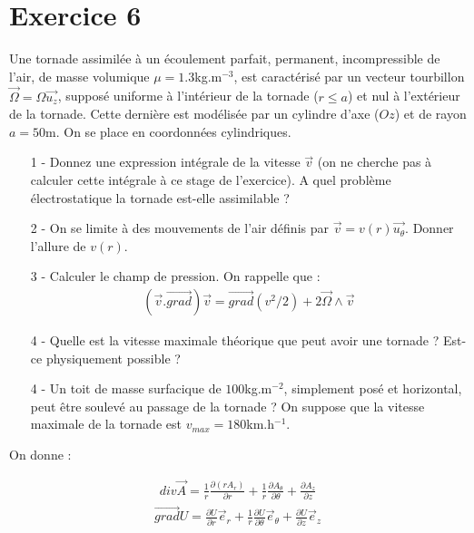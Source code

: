 \documentclass{report}
\begin{document}
\section*{Exercice 6}

Une tornade assimilée à un écoulement parfait, permanent, incompressible de l'air, de masse volumique $\mu = 1.3$kg.m$^{-3}$, est caractérisé par un vecteur tourbillon $\vec{\Omega} = \Omega \vec{u_{z}}$, supposé uniforme à l'intérieur de la tornade ($r\leq a$) et nul à l'extérieur de la tornade. Cette dernière est modélisée par un cylindre d'axe ($Oz$) et de rayon $a=50$m. On se place en coordonnées cylindriques.

\begin{itemize}

	\item[1 - ] Donnez une expression intégrale de la vitesse $\vec{v}$ (on ne cherche pas à calculer cette intégrale à ce stage de l'exercice). A quel problème électrostatique la tornade est-elle assimilable ?
	\item[2 - ] On se limite à des mouvements de l'air définis par $\vec{v} = v(r)\vec{u_{\theta}}$. Donner l'allure de $v(r)$.
	\item[3 - ] Calculer le champ de pression. On rappelle que : 
	\begin{align*}
		(\vec{v}.\vec{grad})\vec{v} =\vec{grad}(v^{2}/2) + 2\vec{\Omega}\wedge \vec{v}
	\end{align*}
	\item[4 - ] Quelle est la vitesse maximale théorique que peut avoir une tornade ? Est-ce physiquement possible ?
	\item[4 - ] Un toit de masse surfacique de $100$kg.m$^{-2}$, simplement posé et horizontal, peut être soulevé au passage de la tornade ? On suppose que la vitesse maximale de la tornade est $v_{max} = 180$km.h$^{-1}$.
\end{itemize}

On donne :

\begin{align*}
	div\vec{A} = \frac{1}{r}\frac{\partial(rA_{r})}{\partial r} +\frac{1}{r}\frac{\partial A_{\theta}}{\partial\theta} + \frac{\partial A_{z}}{\partial z}
\end{align*}
\begin{align*}
	\vec{grad}U = \frac{\partial U}{\partial r}\vec{e}_{r} +\frac{1}{r}\frac{\partial U}{\partial\theta}\vec{e}_{\theta} + \frac{\partial U}{\partial z}\vec{e}_{z}
\end{align*}
\end{document}
